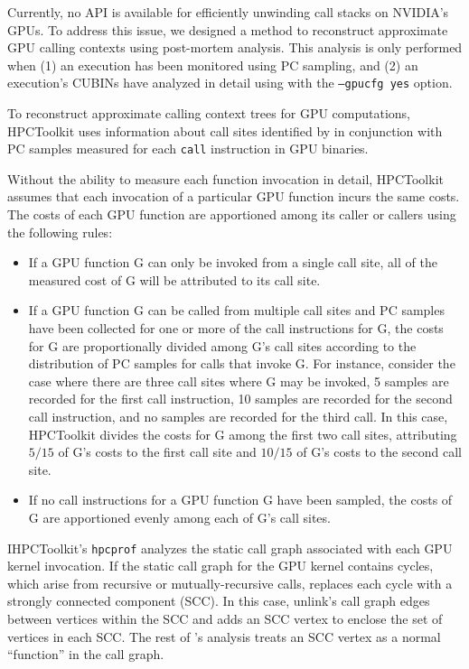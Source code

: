 Currently, no API is available for efficiently unwinding call stacks on NVIDIA's GPUs.
To address this issue, we designed a method to reconstruct approximate GPU calling contexts using post-mortem analysis. This analysis is only performed when (1) an execution has been monitored using PC sampling, and (2) an execution's CUBINs have analyzed in detail using \hpcstruct{} with the {\tt --gpucfg yes} option.

To reconstruct approximate calling context trees for GPU computations, HPCToolkit uses information about call sites identified by \hpcstruct{} in conjunction with PC samples measured for each {\tt call} instruction in GPU binaries. 

Without the ability to measure each function invocation in detail, HPCToolkit assumes that each invocation of a particular GPU function incurs the same costs. The costs of each GPU function are apportioned among its caller or callers using the following rules:

\begin{itemize}
\item
If a GPU function G can only be invoked from a single call site, all of the measured cost of G will be attributed to its call site. 
\item
If a GPU function G can be called from multiple call sites and PC samples have been collected for one or more of the call instructions for G, the costs for G are proportionally divided among G's call sites according to the distribution of PC samples for calls that invoke G.  For instance, consider the case where there are three call sites where G may be invoked, 5 samples are recorded for the first call instruction, 10 samples are recorded for the second call instruction, and no samples are recorded for the third call. In this case, HPCToolkit divides the costs for G  among the first two call sites, attributing $5/15$ of G's costs  to the first call site and $10/15$ of G's costs to the second call site. 
\item
If no call instructions for a GPU function G have been sampled, the costs of G are apportioned evenly among each of G's call sites.
\end{itemize}

IHPCToolkit's {\tt hpcprof} analyzes the static call graph associated with each GPU kernel invocation. If the static call graph for the GPU kernel contains cycles, which arise from recursive or mutually-recursive calls,  \hpcprof{} replaces each cycle with a strongly connected component (SCC). In this case, \hpcprof{} unlink's call graph edges between vertices within the SCC and adds an SCC vertex to enclose the set of vertices in each SCC. The rest of \hpcprof{}'s analysis 
treats an SCC vertex as a normal ``function'' in the call graph.

